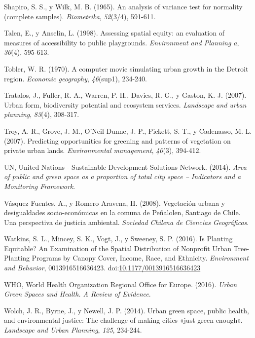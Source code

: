 \documentclass[12pt,a4paper,oneside, openany]{book}
\theoremstyle{definition}
\theoremstyle{definition}
\theoremstyle{definition}
\theoremstyle{remark}
\begin{document}
\hypertarget{ref-shapiro1965analysis}{}
Shapiro, S. S., y Wilk, M. B. (1965). An analysis of variance test for
normality (complete samples). \emph{Biometrika}, \emph{52}(3/4),
591-611.

\hypertarget{ref-talen_assessing_1998}{}
Talen, E., y Anselin, L. (1998). Assessing spatial equity: an evaluation
of measures of accessibility to public playgrounds. \emph{Environment
and Planning a}, \emph{30}(4), 595-613.

\hypertarget{ref-tobler1970computer}{}
Tobler, W. R. (1970). A computer movie simulating urban growth in the
Detroit region. \emph{Economic geography}, \emph{46}(sup1), 234-240.

\hypertarget{ref-tratalos_urban_2007}{}
Tratalos, J., Fuller, R. A., Warren, P. H., Davies, R. G., y Gaston, K.
J. (2007). Urban form, biodiversity potential and ecosystem services.
\emph{Landscape and urban planning}, \emph{83}(4), 308-317.

\hypertarget{ref-troy_predicting_2007}{}
Troy, A. R., Grove, J. M., O'Neil-Dunne, J. P., Pickett, S. T., y
Cadenasso, M. L. (2007). Predicting opportunities for greening and
patterns of vegetation on private urban lands. \emph{Environmental
management}, \emph{40}(3), 394-412.

\hypertarget{ref-un2014sdg}{}
UN, United Nations - Sustainable Development Solutions Network. (2014).
\emph{Area of public and green space as a proportion of total city space
-- Indicators and a Monitoring Framework}.

\hypertarget{ref-vasquez_fuentes_vegetacion_2008}{}
Vásquez Fuentes, A., y Romero Aravena, H. (2008). Vegetación urbana y
desigualdades socio-económicas en la comuna de Peñalolen, Santiago de
Chile. Una perspectiva de justicia ambiental. \emph{Sociedad Chilena de
Ciencias Geográficas}.

\hypertarget{ref-watkins_is_2016}{}
Watkins, S. L., Mincey, S. K., Vogt, J., y Sweeney, S. P. (2016). Is
Planting Equitable? An Examination of the Spatial Distribution of
Nonprofit Urban Tree-Planting Programs by Canopy Cover, Income, Race,
and Ethnicity. \emph{Environment and Behavior}, 0013916516636423.
doi:\href{https://doi.org/10.1177/0013916516636423}{10.1177/0013916516636423}

\hypertarget{ref-who2016urban}{}
WHO, World Health Organization Regional Office for Europe. (2016).
\emph{Urban Green Spaces and Health. A Review of Evidence}.

\hypertarget{ref-wolch_urban_2014}{}
Wolch, J. R., Byrne, J., y Newell, J. P. (2014). Urban green space,
public health, and environmental justice: The challenge of making cities
«just green enough». \emph{Landscape and Urban Planning}, \emph{125},
234-244.
\end{document}
